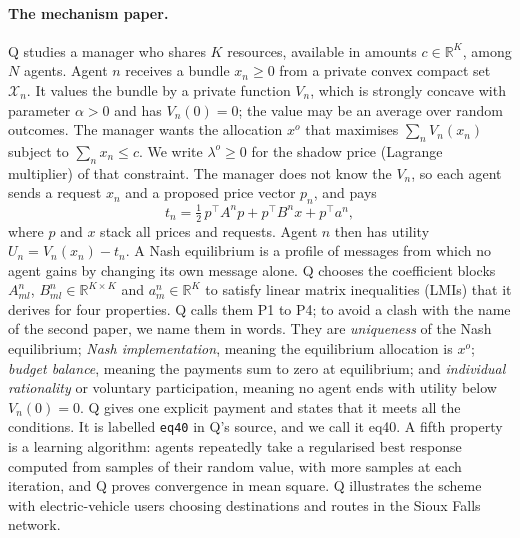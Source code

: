 \documentclass{article}
\begin{document}
\paragraph{The mechanism paper.}
Q \cite{Q} studies a manager who shares \(K\) resources, available in amounts \(c\in\mathbb{R}^K\), among \(N\) agents.
Agent \(n\) receives a bundle \(x_n\ge0\) from a private convex compact set \(\mathcal{X}_n\).
It values the bundle by a private function \(V_n\), which is strongly concave with parameter \(\alpha>0\) and has \(V_n(0)=0\); the value may be an average over random outcomes.
The manager wants the allocation \(x^o\) that maximises \(\sum_nV_n(x_n)\) subject to \(\sum_nx_n\le c\).
We write \(\lambda^o\ge0\) for the shadow price (Lagrange multiplier) of that constraint.
The manager does not know the \(V_n\), so each agent sends a request \(x_n\) and a proposed price vector \(p_n\), and pays
\[
t_n=\tfrac12\,p^\top A^np+p^\top B^nx+p^\top a^n,
\]
where \(p\) and \(x\) stack all prices and requests.
Agent \(n\) then has utility \(U_n=V_n(x_n)-t_n\).
A Nash equilibrium is a profile of messages from which no agent gains by changing its own message alone.
Q chooses the coefficient blocks \(A^n_{ml}\), \(B^n_{ml}\in\mathbb{R}^{K\times K}\) and \(a^n_m\in\mathbb{R}^K\) to satisfy linear matrix inequalities (LMIs) that it derives for four properties.
Q calls them P1 to P4; to avoid a clash with the name of the second paper, we name them in words.
They are \emph{uniqueness} of the Nash equilibrium; \emph{Nash implementation}, meaning the equilibrium allocation is \(x^o\); \emph{budget balance}, meaning the payments sum to zero at equilibrium; and \emph{individual rationality} or voluntary participation, meaning no agent ends with utility below \(V_n(0)=0\).
Q gives one explicit payment and states that it meets all the conditions.
It is labelled \texttt{eq40} in Q's source, and we call it eq40.
A fifth property is a learning algorithm: agents repeatedly take a regularised best response computed from samples of their random value, with more samples at each iteration, and Q proves convergence in mean square.
Q illustrates the scheme with electric-vehicle users choosing destinations and routes in the Sioux Falls network.
\end{document}
